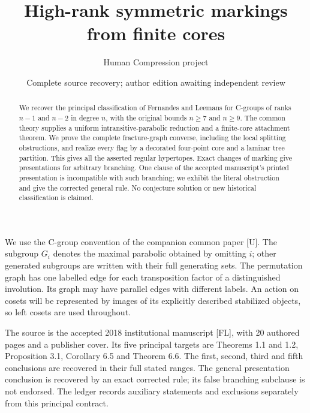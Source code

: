 
\title{High-rank symmetric markings from finite cores}
\author{Human Compression project}
\date{Complete source recovery; author edition awaiting independent review}
\maketitle
\begin{abstract}
We recover the principal classification of Fernandes and Leemans for
C-groups of ranks $n-1$ and $n-2$ in degree $n$, with the original
bounds $n\geq7$ and $n\geq9$. The common theory supplies a uniform
intransitive-parabolic reduction and a finite-core attachment theorem.
We prove the complete fracture-graph converse, including the local
splitting obstructions, and realize every flag by a decorated four-point
core and a laminar tree partition. This gives all the asserted regular
hypertopes. Exact changes of marking give presentations for arbitrary
branching. One clause of the accepted manuscript's printed presentation
is incompatible with such branching; we exhibit the literal obstruction
and give the corrected general rule. No conjecture solution or new
historical classification is claimed.
\end{abstract}
We use the C-group convention of the companion common paper [U]. The subgroup $G_i$ denotes the maximal parabolic obtained by omitting
$i$; other generated subgroups are written with their full generating
sets. The permutation graph has one labelled edge for
each transposition factor of a distinguished involution. Its graph
may have parallel edges with different labels. An action on cosets
will be represented by images of its explicitly described stabilized
objects, so left cosets are used throughout.

The source is the accepted 2018 institutional manuscript [FL], with
20 authored pages and a publisher cover. Its five principal targets are
Theorems 1.1 and 1.2, Proposition 3.1, Corollary 6.5 and Theorem 6.6.
The first, second, third and fifth conclusions are recovered in their
full stated ranges. The general presentation conclusion is recovered
by an exact corrected rule; its false branching subclause is not
endorsed. The ledger records auxiliary statements and exclusions
separately from this principal contract.







